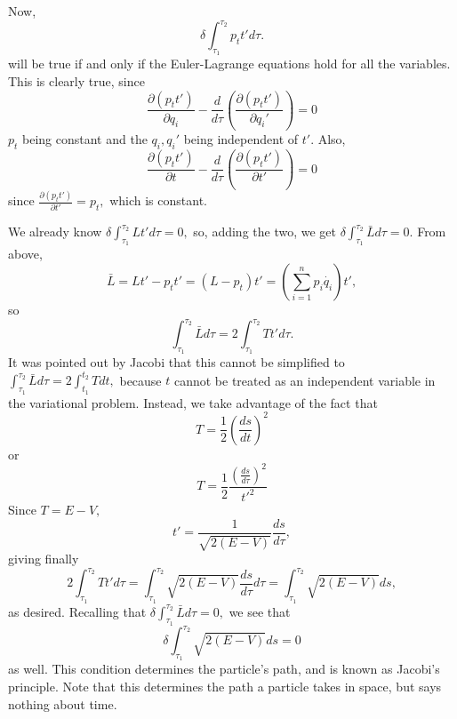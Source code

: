 \documentclass{article}
\begin{document}
Now,
\begin{equation}
\displaystyle\delta\int_{\tau_1}^{\tau_2}p_tt'd\tau.
\end{equation}
will be true if and only if the Euler-Lagrange equations hold for all the variables. This is clearly true, since
\begin{equation}
\frac{\partial(p_tt')}{\partial q_i}-\frac{d}{d\tau}\left(\frac{\partial(p_tt')}{\partial q_i'}\right)=0
\end{equation}
$p_t$ being constant and the $q_i,q_i'$ being independent of $t'$. Also, 
\begin{equation}
\frac{\partial(p_tt')}{\partial t}-\frac{d}{d\tau}\left(\frac{\partial(p_tt')}{\partial t'}\right)=0
\end{equation}
since $\displaystyle\frac{\partial(p_tt')}{\partial t'}=p_t,$ which is constant.

We already know $\displaystyle\delta\int_{\tau_1}^{\tau_2}Lt'd\tau=0,$ so, adding the two, we get $\displaystyle\delta\int_{\tau_1}^{\tau_2}\bar{L}d\tau=0.$ From above, 
\begin{equation}
\bar{L}=Lt'-p_tt'=(L-p_t)t'=\left(\sum_{i=1}^np_i\dot{q_i}\right)t',
\end{equation}
so 
\begin{equation}
\int_{\tau_1}^{\tau_2}\bar{L}d\tau=2\int_{\tau_1}^{\tau_2}Tt'd\tau.
\end{equation}
It was pointed out by Jacobi that this cannot be simplified to $\displaystyle\int_{\tau_1}^{\tau_2}\bar{L}d\tau=2\int_{t_1}^{t_2}Tdt,$ because $t$ cannot be treated as an independent variable in the variational problem. Instead, we take advantage of the fact that
\begin{equation}
T=\frac{1}{2}\left(\frac{ds}{dt}\right)^2
\end{equation}
or
\begin{equation}
T=\frac{1}{2}\frac{\left(\frac{ds}{d\tau}\right)^2}{t'^2}
\end{equation}
Since $T=E-V,$
\begin{equation}
t'=\frac{1}{\sqrt{2(E-V)}}\frac{ds}{d\tau},
\end{equation}
giving finally
\begin{equation}
2\int_{\tau_1}^{\tau_2}Tt'd\tau=\int_{\tau_1}^{\tau_2}\sqrt{2(E-V)}\frac{ds}{d\tau}d\tau=\int_{\tau_1}^{\tau_2}\sqrt{2(E-V)}ds,
\end{equation}
as desired. Recalling that $\displaystyle\delta\int_{\tau_1}^{\tau_2}\bar{L}d\tau=0,$ we see that
\begin{equation}
\delta\int_{\tau_1}^{\tau_2}\sqrt{2(E-V)}ds=0
\end{equation}
as well. This condition determines the particle's path, and is known as Jacobi's principle. Note that this determines the path a particle takes in space, but says nothing about time.
\end{document}
